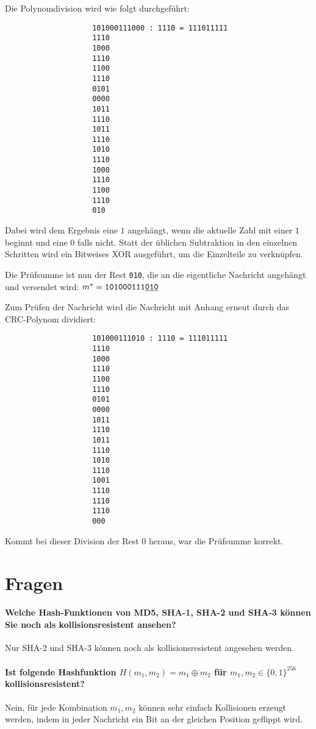 			Die Polynomdivision wird wie folgt durchgeführt:
			\begin{center}
				\begin{BVerbatim}
					101000111000 : 1110 = 111011111
					1110
					1000
					1110
					1100
					1110
					0101
					0000
					1011
					1110
					1011
					1110
					1010
					1110
					1000
					1110
					1100
					1110
					010
				\end{BVerbatim}
			\end{center}
			Dabei wird dem Ergebnis eine \(1\) angehängt, wenn die aktuelle Zahl mit einer \(1\) beginnt und eine \(0\) falls nicht. Statt der üblichen Subtraktion in den einzelnen Schritten wird ein Bitweises XOR ausgeführt, um die Einzelteile zu verknüpfen.

			Die Prüfsumme ist nun der Rest \texttt{010}, die an die eigentliche Nachricht angehängt und versendet wird: \( m^* = \texttt{101000111\underline{010}} \)

			Zum Prüfen der Nachricht wird die Nachricht mit Anhang erneut durch das CRC-Polynom dividiert:
			\begin{center}
				\begin{BVerbatim}
					101000111010 : 1110 = 111011111
					1110
					1000
					1110
					1100
					1110
					0101
					0000
					1011
					1110
					1011
					1110
					1010
					1110
					1001
					1110
					1110
					1110
					000
				\end{BVerbatim}
			\end{center}
			Kommt bei dieser Division der Rest \(0\) heraus, war die Prüfsumme korrekt.

\section{Fragen}
\paragraph{Welche Hash-Funktionen von MD5, SHA-1, SHA-2 und SHA-3 können Sie noch als kollisionsresistent ansehen?}
Nur SHA-2 und SHA-3 können noch als kollisionsresistent angesehen werden.

\paragraph{Ist folgende Hashfunktion \( H(m_1, m_2) = m_1 \oplus m_2 \) für \( m_1, m_2 \in \{0, 1\}^{256} \) kollisionsresistent?}
Nein, für jede Kombination \( m_1, m_2 \) können sehr einfach Kollisionen erzeugt werden, indem in jeder Nachricht ein Bit an der gleichen Position geflippt wird.

